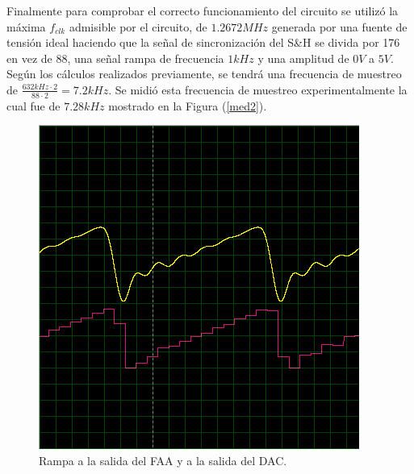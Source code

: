 Finalmente para comprobar el correcto funcionamiento del circuito se utilizó la máxima $f_{clk}$ admisible por el circuito, de $1.2672MHz$ generada por una fuente de tensión ideal haciendo que la señal de sincronización del S\&H se divida por 176 en vez de 88, una señal rampa de frecuencia $1kHz$ y una amplitud de $0V$ a $5V$.
\\
Según los cálculos realizados previamente, se tendrá una frecuencia de muestreo de $\frac{632kHz \cdot 2}{88 \cdot 2} = 7.2kHz$. Se midió esta frecuencia de muestreo experimentalmente la cual fue de $7.28kHz$ mostrado en la Figura (\ref{med2}).

\begin{multicols}{2}

\begin{figure}[H]
\centering
\includegraphics[width=0.9\linewidth]{ImagenesEjercicio1/med1.png}
\caption{Rampa a la salida del FAA y a la salida del DAC.}
\label{med1}
\end{figure}


\end{multicols}
